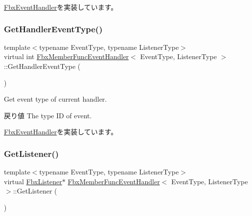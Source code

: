 \hyperlink{class_fbx_event_handler_a46357ba45116a30c8f53c3e5fe9ba2fb}{Fbx\+Event\+Handler}を実装しています。

\mbox{\label{class_fbx_member_func_event_handler_a57856423663f283503e6498a7eacb0b4}} 
\subsubsection{\texorpdfstring{Get\+Handler\+Event\+Type()}{GetHandlerEventType()}}
{\footnotesize\ttfamily template$<$typename Event\+Type, typename Listener\+Type$>$ \\
virtual int \hyperlink{class_fbx_member_func_event_handler}{Fbx\+Member\+Func\+Event\+Handler}$<$ Event\+Type, Listener\+Type $>$\+::Get\+Handler\+Event\+Type (\begin{DoxyParamCaption}{ }\end{DoxyParamCaption})\hspace{0.3cm}{\ttfamily [virtual]}}

Get event type of current handler. \begin{DoxyReturn}{戻り値}
The type ID of event. 
\end{DoxyReturn}


\hyperlink{class_fbx_event_handler_a0b42d2b93e63d866975f468a481c9f3c}{Fbx\+Event\+Handler}を実装しています。

\mbox{\label{class_fbx_member_func_event_handler_ad45db7b531f23f9e7776c93bec100668}} 
\subsubsection{\texorpdfstring{Get\+Listener()}{GetListener()}}
{\footnotesize\ttfamily template$<$typename Event\+Type, typename Listener\+Type$>$ \\
virtual \hyperlink{class_fbx_listener}{Fbx\+Listener}$\ast$ \hyperlink{class_fbx_member_func_event_handler}{Fbx\+Member\+Func\+Event\+Handler}$<$ Event\+Type, Listener\+Type $>$\+::Get\+Listener (\begin{DoxyParamCaption}{ }\end{DoxyParamCaption})\hspace{0.3cm}{\ttfamily [virtual]}}

